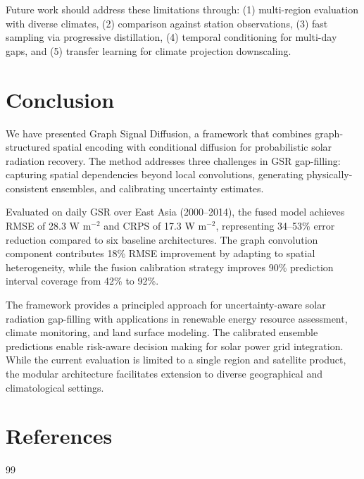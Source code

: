 \documentclass[preprint,12pt]{elsarticle}
\begin{document}
{Future work should address these limitations through: (1) multi-region evaluation with diverse climates, (2) comparison against station observations, (3) fast sampling via progressive distillation, (4) temporal conditioning for multi-day gaps, and (5) transfer learning for climate projection downscaling.

\section{Conclusion}
\label{sec:conclusion}

We have presented Graph Signal Diffusion, a framework that combines graph-structured spatial encoding with conditional diffusion for probabilistic solar radiation recovery. The method addresses three challenges in GSR gap-filling: capturing spatial dependencies beyond local convolutions, generating physically-consistent ensembles, and calibrating uncertainty estimates.

Evaluated on daily GSR over East Asia (2000--2014), the fused model achieves RMSE of 28.3 W m$^{-2}$ and CRPS of 17.3 W m$^{-2}$, representing 34--53\% error reduction compared to six baseline architectures. The graph convolution component contributes 18\% RMSE improvement by adapting to spatial heterogeneity, while the fusion calibration strategy improves 90\% prediction interval coverage from 42\% to 92\%.

The framework provides a principled approach for uncertainty-aware solar radiation gap-filling with applications in renewable energy resource assessment, climate monitoring, and land surface modeling. The calibrated ensemble predictions enable risk-aware decision making for solar power grid integration. While the current evaluation is limited to a single region and satellite product, the modular architecture facilitates extension to diverse geographical and climatological settings.

\section*{References}

\begin{thebibliography}{99}


\end{thebibliography}}
\end{document}
